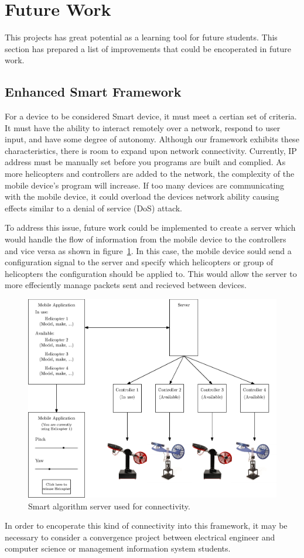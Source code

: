 \section{Future Work}
This projects has great potential as a learning tool for future students.  This section has prepared a list of improvements that could be encoperated in future work.

\subsection{Enhanced Smart Framework}
For a device to be considered Smart device, it must meet a certian set of criteria.  It must have the ability to interact remotely over a network, respond to user input, and have some degree of autonomy.  Although our framework exhibits these characteristics, there is room to expand upon network connectivity.  Currently, IP address must be manually set before you programs are built and complied.  As more helicopters and controllers are added to the network, the complexity of the mobile device's program will increase.  If too many devices are communicating with the mobile device, it could overload the devices network ability causing effects similar to a denial of service (DoS) attack.

To address this issue, future work could be implemented to create a server which would handle the flow of information from the mobile device to the controllers and vice versa as shown in figure~\ref{fig:Smart_Alg}.  In this case, the mobile device sould send a configuration signal to the server and specify which helicopters or group of helicopters the configuration should be applied to.  This would allow the server to more effeciently manage packets sent and recieved between devices.

\begin{figure}[!htbp]
    \centering
    \includegraphics[width=.46\textwidth,keepaspectratio=true]{figs/ipe/smartAlg.eps}
    \caption{Smart algorithm server used for connectivity.}
    \label{fig:Smart_Alg}
\end{figure}
In order to encoperate this kind of connectivity into this framework, it may be necessary to consider a convergence project between electrical engineer and computer science or management information system students.

